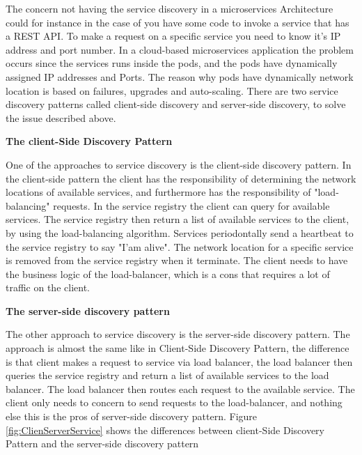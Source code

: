 The concern not having the service discovery in a microservices Architecture could for instance in the case of you have some code to invoke a service that has a REST API. To make a request on a specific service you need to know it's IP address and port number. In a cloud-based microservices application the problem occurs since the services runs inside the pods, and the pods have dynamically assigned IP addresses and Ports. The reason why pods have dynamically network location is based on failures, upgrades and auto-scaling. There are two service discovery patterns called client-side discovery and server-side discovery, to solve the issue described above.         

\textbf{The client-Side Discovery Pattern}

One of the approaches to service discovery is the client-side discovery pattern. In the client-side pattern the client has the responsibility of determining the network locations of available services, and furthermore has the responsibility of "load-balancing" requests. In the service registry the client can query for available services. The service registry then return a list of available services to the client, by using the load-balancing algorithm. Services periodontally send a heartbeat to the service registry to say "I'am alive". The network location for a specific service is removed from the service registry when it terminate. The client needs to have the business logic of the load-balancer, which is a cons that requires a lot of traffic on the client.

\textbf{The server-side discovery pattern}

The other approach to service discovery is the server-side discovery pattern. The approach is almost the same like in Client-Side Discovery Pattern, the difference is that client makes a request to service via load balancer, the load balancer then queries the service registry and return a list of available services to the load balancer. The load balancer then routes each request to the available service. The client only needs to concern to send requests to the load-balancer, and nothing else this is the pros of server-side discovery pattern.    Figure \ref{fig:ClienServerService} shows the differences between client-Side Discovery Pattern and the server-side discovery pattern  



